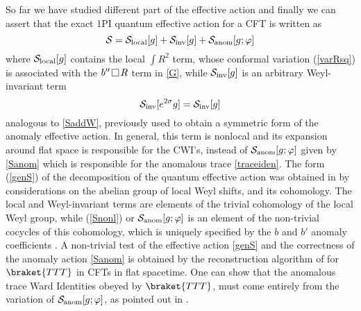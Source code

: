 \documentclass[a4paper,11pt,openright,twoside]{book}
\let\s=\sigma  \let\t=\tau     \let\u=\upsilon \let\f=\phi
\def\nbox#1#2{\vcenter{\hrule \hbox{\vrule height#2in
			\kern#1in \vrule} \hrule}}
\def\sq{\,\raise.5pt\hbox{$\nbox{.09}{.09}$}\,}
\numberwithin{equation}{section}
\begin{document}
{{{So far we have studied different part of the effective action and finally we can assert that the exact 1PI quantum effective action for a CFT is written as
\begin{equation}
	\mathcal{S} = \mathcal{S}_{\rm local}[g] + \mathcal{S}_{\rm inv}[g] + \mathcal{S}_{\rm anom}[g;\varphi]
	\label{genS}
\end{equation}
where $\mathcal{S}_{\rm local}[g]$ contains the local $\int R^2$ term, whose conformal variation (\ref{varRsq}) 
is associated with the $b'' \sq R$ term in \eqref{G},
while $\mathcal{S}_{\rm inv}[g]$ is an arbitrary Weyl-invariant term
\begin{equation}
	\mathcal{S}_{\rm inv}[e^{2\s}g] = \mathcal{S}_{\rm inv}[g]
\end{equation}
analogous to \eqref{SaddW}, previously used to obtain a symmetric form of the anomaly effective action. In general, this term is nonlocal and its expansion around flat space is responsible for the CWI's, instead of  $\mathcal{S}_{\rm anom}[g;\varphi]$ given by \eqref{Sanom} which is responsible for the anomalous trace \eqref{traceiden}. The form (\ref{genS}) of the decomposition 
of the quantum effective action was obtained in \cite{Mazur:2001aa} by considerations on the abelian group of local Weyl shifts, 
and its cohomology. The local and Weyl-invariant terms are elements of the trivial cohomology of the local Weyl group, while (\ref{Snonl}) or $\mathcal{S}_{\rm anom}[g;\varphi]$ is an element of the non-trivial cocycles of this cohomology, which is uniquely specified by the $b$ and $b'$ anomaly coefficients \cite{Antoniadis:1992xu,Mazur:2001aa,Bonora:83,Karakhanian:1994yd,Arakelian:1995ye}. 
A non-trivial test of the effective action \eqref{genS} and the correctness of the anomaly 
action \eqref{Sanom} is obtained by the reconstruction algorithm of \cite{Bzowski:2013sza} for $\braket{TTT}$ in CFTs in flat spacetime. One can show that the anomalous trace Ward Identities obeyed by $\braket{ TTT}$, must come entirely from the variation of $\mathcal{S}_{\rm anom}[g;\varphi]$, as pointed out in \cite{ Coriano:2018bsy,Mottola:2010}.
}
{
}}}
\end{document}
